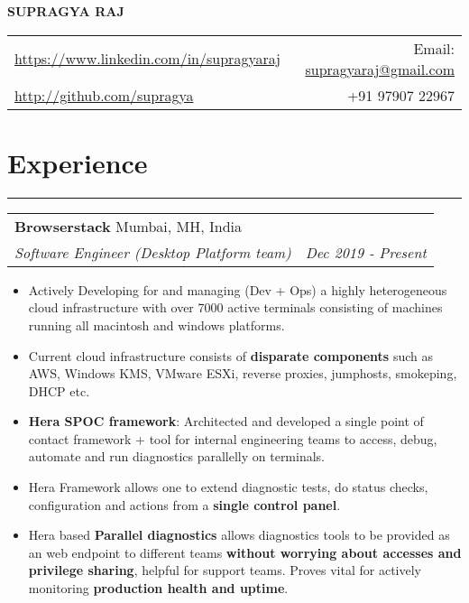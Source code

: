 \documentclass[a4paper,6pt]{article}
\begin{document}
\begin{center}
\Large \textbf{SUPRAGYA RAJ}


\end{center}
\begin{tabularx}{\textwidth}{X r}
	\href{https://www.linkedin.com/in/supragyaraj}{https://www.linkedin.com/in/supragyaraj} & Email: \href{mailto:supragyaraj@gmail.comj}{supragyaraj@gmail.com} \\
	\href{http://github.com/supragya}{http://github.com/supragya} & +91 97907 22967 
\end{tabularx}


\section*{Experience}
\vspace{-8px}
\hrule


\vspace{4px}
\hspace{5px}
\begin{tabularx}{\textwidth}{X r}
	\large{\textbf{Browserstack }} \small Mumbai, MH, India& \\
	\textit{\small Software Engineer (Desktop Platform team)} & \textit{Dec 2019 - Present} \\
\end{tabularx}

\small
\begin{itemize}
	\itemsep0em
	\item Actively Developing for and managing (Dev + Ops) a highly heterogeneous cloud infrastructure with over 7000 active terminals consisting of machines running all macintosh and windows platforms.
	\item Current cloud infrastructure consists of \textcolor{mygray}{\textbf{disparate components}} such as AWS, Windows KMS, VMware ESXi, reverse proxies, jumphosts, smokeping, DHCP etc.
    \item \textcolor{mygray}{\textbf{Hera SPOC framework}}: Architected and developed a single point of contact framework + tool for internal engineering teams to access, debug, automate and run diagnostics parallelly on terminals. 
    \item Hera Framework allows one to extend diagnostic tests, do status checks, configuration and actions from a \textcolor{mygray}{\textbf{single control panel}}.
    \item Hera based \textcolor{mygray}{\textbf{Parallel diagnostics}} allows diagnostics tools to be provided as an web endpoint to different teams \textcolor{mygray}{\textbf{without worrying about accesses and privilege sharing}}, helpful for support teams. Proves vital for actively monitoring \textcolor{mygray}{\textbf{production health and uptime}}.
  \end{itemize}
\end{document}
